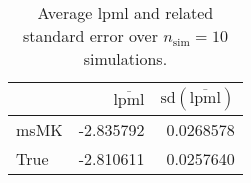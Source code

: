 \begin{table}[H]

\caption{Average lpml and related standard error over $n_{\text{sim}} = 10$ simulations.}
\centering
\begin{tabular}[t]{lrr}
\toprule
  & $\overbar{\text{lpml}}$ & $\text{sd}(\overbar{\text{lpml}})$\\
\midrule
msMK & -2.835792 & 0.0268578\\
True & -2.810611 & 0.0257640\\
\bottomrule
\end{tabular}
\end{table}